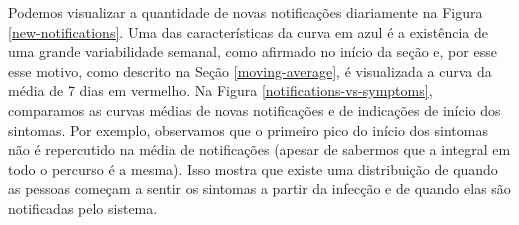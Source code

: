 \begin{table}
    \centering
    \caption{Cinco casos confirmados e os dados individuais: data de notificação, data de inicío dos sintomas, bairro de residência, área de planejamento em saúde, sexo, faixa etária, evolução, data de evolução e raça.}
    \label{tab:data-covid-rio}
\end{table}

Podemos visualizar a quantidade de novas notificações diariamente na Figura \ref{new-notifications}. 
Uma das características da curva em azul é a existência de uma grande variabilidade semanal, como afirmado no início da seção e, por esse esse motivo, como descrito na Seção \ref{moving-average}, é visualizada a curva da média de 7 dias em vermelho. 
Na Figura \ref{notifications-vs-symptoms}, comparamos as curvas médias de novas notificações e de indicações de início dos sintomas. 
Por exemplo, observamos que o primeiro pico do início dos sintomas não é repercutido na média de notificações (apesar de sabermos que a integral em todo o percurso é a mesma). Isso mostra que existe uma distribuição de quando as pessoas começam a sentir os sintomas a partir da infecção e de quando elas são notificadas pelo sistema. 

